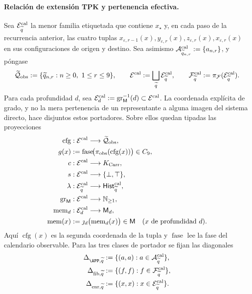 \paragraph{Relación de extensión TPK y pertenencia efectiva.}
Sea \(\mathcal E^{\rm cal}_{\widetilde q}\) la menor familia etiquetada que contiene
\(x_\star\) y, en cada paso de la recurrencia anterior, las cuatro tuplas
\(x_{\varepsilon,r-1}(x),y_{\varepsilon,r}(x),
z_{\varepsilon,r}(x),x_{\varepsilon,r}(x)\) en sus configuraciones de origen
y destino. Sea asimismo
\(\mathcal A^{\rm cal}_{\widetilde q_{n,r}}:=\{a_{n,r}\}\), y póngase
\[
 \widetilde{\mathcal Q}_{\rm obs}:=
   \{\widetilde q_{n,r}:n\ge0,\ 1\le r\le9\},
 \qquad
 \mathcal E^{\rm cal}:=\bigsqcup_{\widetilde q}
     \mathcal E^{\rm cal}_{\widetilde q},
 \qquad
 \mathcal F^{\rm cal}_{\widetilde q}:=
     \pi_{\mathcal F}(\mathcal E^{\rm cal}_{\widetilde q}).
\]
Para cada profundidad \(d\), sea
\(\mathcal E^{\rm cal}_d:=
\operatorname{gr}_{\mathsf M}^{-1}(d)\subset\mathcal E^{\rm cal}\). La
coordenada explícita de grado, y no la mera pertenencia de un representante a
alguna imagen del sistema directo, hace disjuntos estos portadores. Sobre ellos
quedan tipadas las proyecciones
\[
\begin{aligned}
 \operatorname{cfg}&:\mathcal E^{\rm cal}\longrightarrow
     \widetilde{\mathcal Q}_{\rm obs},\\
 g(x)&:=\operatorname{fase}\!
       \bigl(\pi_{\rm obs}(\operatorname{cfg}(x))\bigr)\in C_9,\\
 c&:\mathcal E^{\rm cal}\longrightarrow K_{\rm Carr},\\
 s&:\mathcal E^{\rm cal}\longrightarrow\{\bot,\top\},\\
 \lambda&:\mathcal E^{\rm cal}_{\widetilde q}
       \longrightarrow\mathsf{Hist}^{\rm cal}_{\widetilde q},\\
 \operatorname{gr}_{\mathsf M}&:\mathcal E^{\rm cal}
       \longrightarrow\mathbb N_{\ge1},\\
 \operatorname{mem}_d&:\mathcal E^{\rm cal}_d
       \longrightarrow\mathsf M_d,\\
 \operatorname{mem}(x)&:=
       \jmath_d\bigl(\operatorname{mem}_d(x)\bigr)\in\mathsf M
       \quad(x\text{ de profundidad }d).
\end{aligned}
\]
Aquí \(\operatorname{cfg}(x)\) es la segunda coordenada de la tupla y
\(\operatorname{fase}\) lee la fase del calendario observable. Para las tres
clases de portador se fijan las diagonales
\[
\begin{aligned}
 \Delta_{\APP,\widetilde q}
   &:=\{(a,a):a\in\mathcal A^{\rm cal}_{\widetilde q}\},\\
 \Delta_{{\rm fib},\widetilde q}
   &:=\{(f,f):f\in\mathcal F^{\rm cal}_{\widetilde q}\},\\
 \Delta_{{\rm enr},\widetilde q}
   &:=\{(x,x):x\in\mathcal E^{\rm cal}_{\widetilde q}\}.
\end{aligned}
\]
